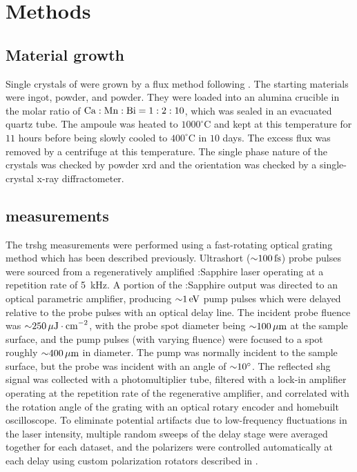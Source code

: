 \section{Methods}

\subsection{Material growth}

Single crystals of \cmb were grown by a  flux method following \citet{gibson_magnetic_2015}.
The starting materials were  ingot,  powder, and  powder.
They were loaded into an alumina crucible in the molar ratio of $\ce{Ca}:\ce{Mn}:\ce{Bi} = 1:2:10$, which was sealed in an evacuated quartz tube.
The ampoule was heated to $1000^\circ$\si{C} and kept at this temperature for $11$ hours before being slowly cooled to $400^\circ$\si{C} in $10$ days.
The excess flux was removed by a centrifuge at this temperature.
The single phase nature of the crystals was checked by powder \gls{xrd} and the orientation was checked by a single-crystal x-ray diffractometer.

\subsection{ measurements}

The \gls{trshg} measurements were performed using a fast-rotating optical grating method which has been described previously\citep{fichera_second_2020, harter_high-speed_2015, torchinsky_low_2014}.
Ultrashort (${\sim} \qty{100}{fs}$) probe pulses were sourced from a regeneratively amplified :Sapphire laser operating at a repetition rate of \qty{5}{kHz}.
A portion of the :Sapphire output was directed to an optical parametric amplifier, producing ${\sim} \qty{1}{eV}$ pump pulses which were delayed relative to the probe pulses with an optical delay line.
The incident probe fluence was ${\sim} \qty{250}{\mu J \cdot cm^{-2}}$, with the probe spot diameter being ${\sim} \qty{100}{\mu m}$ at the sample surface, and the pump pulses (with varying fluence) were focused to a spot roughly ${\sim} \qty{400}{\mu m}$ in diameter.
The pump was normally incident to the sample surface, but the probe was incident with an angle of ${\sim} \ang{10}$.
The reflected \gls{shg} signal was collected with a photomultiplier tube, filtered with a lock-in amplifier operating at the repetition rate of the regenerative amplifier, and correlated with the rotation angle of the grating with an optical rotary encoder and homebuilt oscilloscope.
To eliminate potential artifacts due to low-frequency fluctuations in the laser intensity, multiple random sweeps of the delay stage were averaged together for each dataset, and the polarizers were controlled automatically at each delay using custom polarization rotators described in \citet{morey_automated_2024}.

